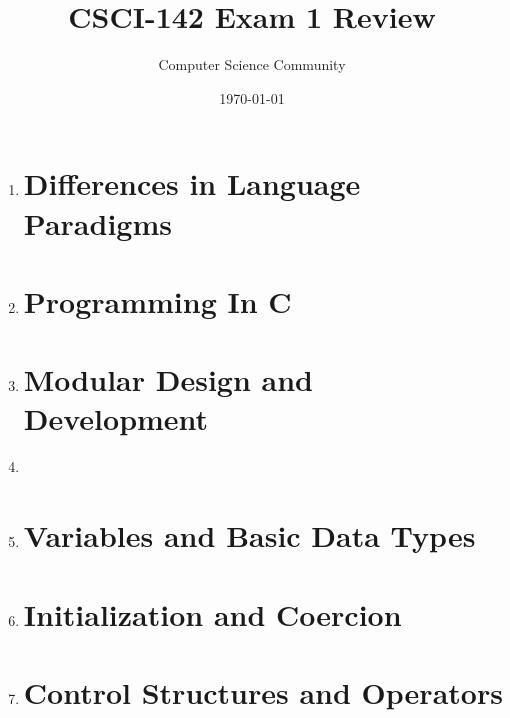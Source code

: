 \documentclass[11pt]{article}
\title{CSCI-142 Exam 1 Review}
\author{Computer Science Community}
\date{\today}
\begin{document}
\header

\begin{enumerate}

\section*{History and Evolution of Programming Languages}

	\item 

\section*{Differences in Language Paradigms}

	\item 

\section*{Programming In C}

	\item 

\section*{Modular Design and Development}

	\item 
	\item 

\section*{Variables and Basic Data Types}

	\item 

\section*{Initialization and Coercion}

	\item 

\pagebreak
\section*{Control Structures and Operators}


\end{enumerate}
\end{document}
